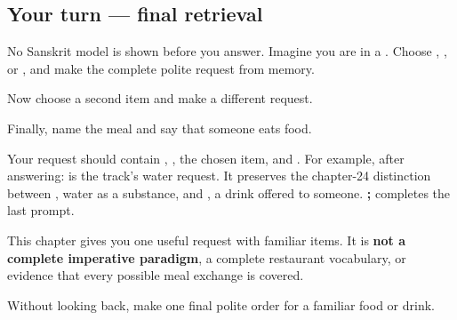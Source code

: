 \subsection*{Your turn — final retrieval}
No Sanskrit model is shown before you answer. Imagine you are in a \textbf{}. Choose \textbf{}, \textbf{}, or \textbf{}, and make the complete polite request from memory.

Now choose a second item and make a different request.

Finally, name the meal and say that someone eats food.

\begin{grammarlens}[title={What you've built}]
Your request should contain \textbf{}, \textbf{}, the chosen item, and \textbf{}. For example, after answering: \textbf{   } is the track's water request. It preserves the chapter-24 distinction between \textbf{}, water as a substance, and \textbf{}, a drink offered to someone. \textbf{;  } completes the last prompt.
\end{grammarlens}

\begin{grammarlens}[title={Grammar Lens: the boundary}]
This chapter gives you one useful request with familiar items. It is \textbf{not a complete imperative paradigm}, a complete restaurant vocabulary, or evidence that every possible meal exchange is covered.
\end{grammarlens}

\begin{tcolorbox}[breakable,colback=teal!4,colframe=teal!35!black,title={Before you move on}]
Without looking back, make one final polite order for a familiar food or drink.
\end{tcolorbox}
